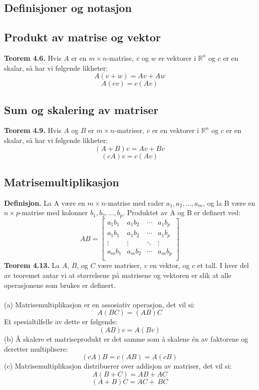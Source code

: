\documentclass{article}
\begin{document}
\subsection{Definisjoner og notasjon}


\subsection{Produkt av matrise og vektor}
\textbf{Teorem 4.6.} Hvis $A$ er en $m \times n$-matrise, $v$ og $w$ er vektorer i $\mathbb{R}^n$ og $c$ er en skalar, så har vi følgende likheter:
\[ A(v + w) = Av + Aw \]
\[ A(cv) = c(Av) \]


\subsection{Sum og skalering av matriser}
\textbf{Teorem 4.9.} Hvis $A$ og $B$ er $m \times n$-matriser, $v$ er en vektorer i $\mathbb{R}^n$ og $c$ er en skalar, så har vi følgende likheter:
\[ (A + B)v = Av + Bv \]
\[ (cA)v = c(Av) \]


\subsection{Matrisemultiplikasjon}
\textbf{Definisjon.} La A være en $m \times n$-matrise med rader
$a_1, a_2, \dots, a_m$, og la B være en $n \times p$-matrise med
kolonner $b_1, b_2, \dots, b_p$. Produktet av A og B er definert ved:
\[ AB = \begin{bmatrix}
a_1b_1 & a_1b_2 & \cdots & a_1b_p \\
a_1b_1 & a_1b_2 & \cdots & a_1b_p \\
\vdots & \vdots & \ddots & \vdots \\
a_mb_1 & a_mb_2 & \cdots & a_mb_p \\
\end{bmatrix} \]
\textbf{Teorem 4.13.} La $A$, $B$, og $C$ være matriser, $v$ en vektor, og $c$ et tall. I hver del av teoremet antar vi at størrelsene på matrisene og vektoren er slik at alle operasjonene som brukes er definert.\\\\
(a) Matrisemultiplikasjon er en assosiativ operasjon, det vil si:
\[ A(BC) = (AB)C \]
Et spesialtilfelle av dette er følgende:
\[ (AB)v = A(Bv) \]
(b) Å skalere et matriseprodukt er det samme som å skalene én av faktorene og deretter multiplisere:
\[ (cA)B = c(AB) = A(cB) \]
(c) Matrisemultiplikasjon distribuerer over addisjon av matriser, det vil si:
\[ A(B+C) = AB + AC \]
\[ (A + B)C = AC +\ BC \]
\end{document}
